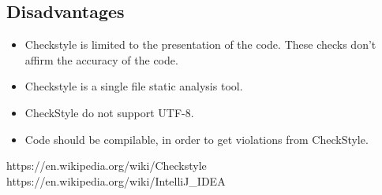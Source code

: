 \documentclass{article}
\begin{document}
\subsection{Disadvantages}
\begin{itemize}
   \item Checkstyle is limited to the presentation of the code. These checks don't affirm the accuracy of the code.
   \item Checkstyle is a single file static analysis tool.
   \item CheckStyle do not support UTF-8.
   \item Code should be compilable, in order to get violations from CheckStyle. 
\end{itemize}
\pagebreak


\begin{thebibliography}{}

{https://en.wikipedia.org/wiki/Checkstyle}
{https://en.wikipedia.org/wiki/IntelliJ_IDEA}

\end{thebibliography}
\end{document}
